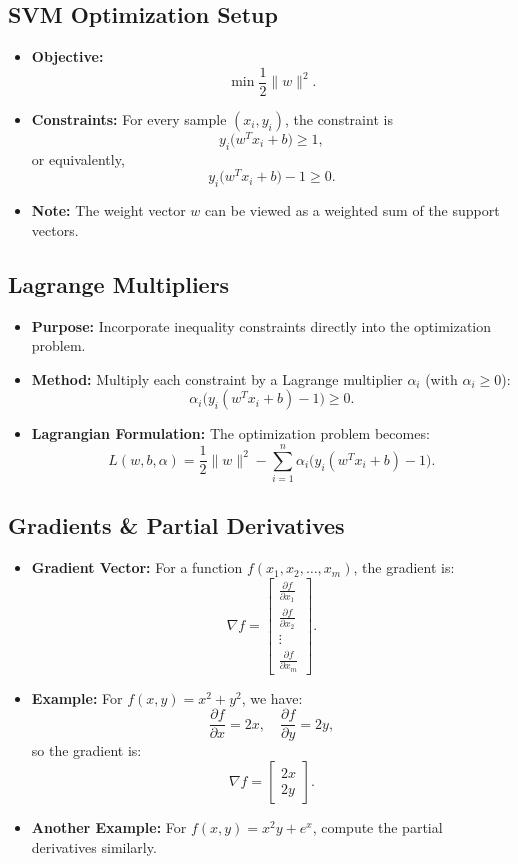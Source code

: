 \documentclass[11pt]{article}
\begin{document}
\subsection{SVM Optimization Setup}
\begin{itemize}
    \item \textbf{Objective:}
    \[
    \min \frac{1}{2}\|w\|^2.
    \]
    \item \textbf{Constraints:} For every sample $(x_i, y_i)$, the constraint is
    \[
    y_i \bigl(w^T x_i + b\bigr) \geq 1,
    \]
    or equivalently,
    \[
    y_i \bigl(w^T x_i + b\bigr) - 1 \geq 0.
    \]
    \item \textbf{Note:} The weight vector $w$ can be viewed as a weighted sum of the support vectors.
\end{itemize}

\subsection{Lagrange Multipliers}
\begin{itemize}
    \item \textbf{Purpose:} Incorporate inequality constraints directly into the optimization problem.
    \item \textbf{Method:} Multiply each constraint by a Lagrange multiplier $\alpha_i$ (with $\alpha_i \geq 0$):
    \[
    \alpha_i \bigl( y_i (w^T x_i + b) - 1 \bigr) \geq 0.
    \]
    \item \textbf{Lagrangian Formulation:} The optimization problem becomes:
    \[
    L(w, b, \alpha) = \frac{1}{2}\|w\|^2 - \sum_{i=1}^{n} \alpha_i \bigl( y_i (w^T x_i + b) - 1 \bigr).
    \]
\end{itemize}

\subsection{Gradients \& Partial Derivatives}
\begin{itemize}
    \item \textbf{Gradient Vector:} For a function $f(x_1,x_2,\dots,x_m)$, the gradient is:
    \[
    \nabla f = \begin{bmatrix}
    \frac{\partial f}{\partial x_1} \\
    \frac{\partial f}{\partial x_2} \\
    \vdots \\
    \frac{\partial f}{\partial x_m}
    \end{bmatrix}.
    \]
    \item \textbf{Example:} For $f(x,y) = x^2 + y^2$, we have:
    \[
    \frac{\partial f}{\partial x} = 2x, \quad \frac{\partial f}{\partial y} = 2y,
    \]
    so the gradient is:
    \[
    \nabla f = \begin{bmatrix} 2x \\ 2y \end{bmatrix}.
    \]
    \item \textbf{Another Example:} For $f(x,y) = x^2 y + e^x$, compute the partial derivatives similarly.
\end{itemize}
\end{document}

